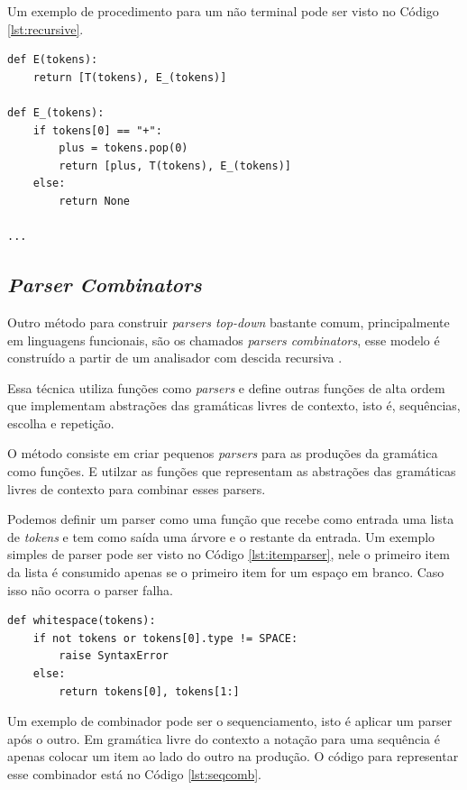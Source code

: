 Um exemplo de procedimento para um não terminal pode ser visto no Código \ref{lst:recursive}.

\begin{lstlisting}[caption=Exemplo de procedimento em pseudo-python para um não terminal,label={lst:recursive}]
def E(tokens):
    return [T(tokens), E_(tokens)]

def E_(tokens):
    if tokens[0] == "+":
        plus = tokens.pop(0)
        return [plus, T(tokens), E_(tokens)]
    else:
        return None

...
\end{lstlisting}


\subsection{\textit{Parser Combinators}}

Outro método para construir \textit{parsers top-down} bastante comum, 
principalmente em linguagens funcionais, são os chamados \textit{parsers combinators},
esse modelo é construído a partir de um analisador com descida recursiva \cite{hutton1996monadic}.

Essa técnica utiliza funções como \textit{parsers} e define outras funções de alta ordem que
implementam abstrações das gramáticas livres de contexto, 
isto é, sequências, escolha e repetição.

O método consiste em criar pequenos \textit{parsers} para as produções da gramática como funções. 
E utilzar as funções que representam as abstrações das gramáticas livres de contexto 
para combinar esses parsers.

Podemos definir um parser como uma função que recebe como entrada uma lista de \textit{tokens}
e tem como saída uma árvore e o restante da entrada. Um exemplo simples de parser pode ser
visto no Código \ref{lst:itemparser}, nele o primeiro item da lista é consumido apenas
se o primeiro item for um espaço em branco. Caso isso não ocorra o parser falha.

\begin{lstlisting}[caption=Exemplo de parser em pseudo-python,label={lst:itemparser}]
def whitespace(tokens):
    if not tokens or tokens[0].type != SPACE:
        raise SyntaxError
    else:
        return tokens[0], tokens[1:]
\end{lstlisting}

Um exemplo de combinador pode ser o sequenciamento, isto é aplicar um parser após o outro. 
Em gramática livre do contexto a notação para uma sequência é apenas colocar um 
item ao lado do outro na produção. O código para representar
esse combinador está no Código \ref{lst:seqcomb}.

